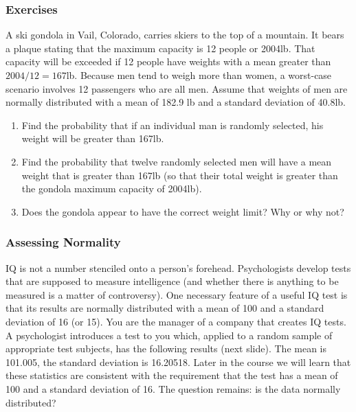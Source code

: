 \documentclass[xcolor=dvipsnames]{beamer}
\begin{document}
\begin{frame}
  \frametitle{Exercises} 
  {\ubung} A ski gondola in Vail, Colorado, carries skiers to the top
  of a mountain. It bears a plaque stating that the maximum capacity
  is 12 people or 2004lb. That capacity will be exceeded if 12 people
  have weights with a mean greater than $2004/12=167$lb. Because men
  tend to weigh more than women, a worst-case scenario involves 12
  passengers who are all men. Assume that weights of men are normally
  distributed with a mean of 182.9 lb and a standard deviation of
  40.8lb.
  \begin{enumerate}
  \item Find the probability that if an individual man is randomly
    selected, his weight will be greater than 167lb.
  \item Find the probability that twelve randomly selected men
    will have a mean weight that is greater than 167lb (so that their
    total weight is greater than the gondola maximum capacity of
    2004lb).
  \item Does the gondola appear to have the correct weight limit?
    Why or why not?
  \end{enumerate}
\end{frame}

\begin{frame}
  \frametitle{Assessing Normality}
  IQ is not a number stenciled onto a person's forehead. Psychologists
  develop tests that are supposed to measure intelligence (and whether
  there is anything to be measured is a matter of controversy). One
  necessary feature of a useful IQ test is that its results are
  normally distributed with a mean of 100 and a standard deviation of
  16 (or 15). You are the manager of a company that creates IQ tests.
  A psychologist introduces a test to you which, applied to a random
  sample of appropriate test subjects, has the following results (next
  slide). The mean is 101.005, the standard deviation is 16.20518.
  Later in the course we will learn that these statistics are
  consistent with the requirement that the test has a mean of 100
  and a standard deviation of 16. The question remains: is the
  data normally distributed?
\end{frame}
\end{document}
